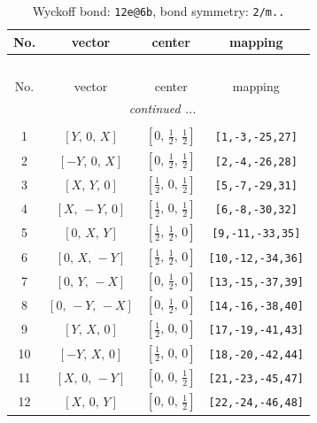 \documentclass[fleqn,8pt]{jsarticle}
\begin{document}
\renewcommand{\arraystretch}{1.2}
\begin{longtable}{cccc}
\caption{Wyckoff bond: {\tt 12e@6b}, bond symmetry: {\tt 2/m..}}
 \\
 \hline \hline
No. & vector & center & mapping \\ \hline \endfirsthead

\multicolumn{3}{l}{\tablename\ \thetable{}} \\
 \hline \hline
No. & vector & center & mapping \\ \hline \endhead

 \hline \hline
\multicolumn{3}{r}{\footnotesize\it continued ...} \\ \endfoot

 \hline \hline
\multicolumn{3}{r}{} \\ \endlastfoot

1 & $\left[ Y,\, 0,\, X \right]$ & $\left[ 0,\, \frac{1}{2},\, \frac{1}{2} \right]$ & {\tt [1,-3,-25,27]} \\ \hline
2 & $\left[ - Y,\, 0,\, X \right]$ & $\left[ 0,\, \frac{1}{2},\, \frac{1}{2} \right]$ & {\tt [2,-4,-26,28]} \\ \hline
3 & $\left[ X,\, Y,\, 0 \right]$ & $\left[ \frac{1}{2},\, 0,\, \frac{1}{2} \right]$ & {\tt [5,-7,-29,31]} \\ \hline
4 & $\left[ X,\, - Y,\, 0 \right]$ & $\left[ \frac{1}{2},\, 0,\, \frac{1}{2} \right]$ & {\tt [6,-8,-30,32]} \\ \hline
5 & $\left[ 0,\, X,\, Y \right]$ & $\left[ \frac{1}{2},\, \frac{1}{2},\, 0 \right]$ & {\tt [9,-11,-33,35]} \\ \hline
6 & $\left[ 0,\, X,\, - Y \right]$ & $\left[ \frac{1}{2},\, \frac{1}{2},\, 0 \right]$ & {\tt [10,-12,-34,36]} \\ \hline
7 & $\left[ 0,\, Y,\, - X \right]$ & $\left[ 0,\, \frac{1}{2},\, 0 \right]$ & {\tt [13,-15,-37,39]} \\ \hline
8 & $\left[ 0,\, - Y,\, - X \right]$ & $\left[ 0,\, \frac{1}{2},\, 0 \right]$ & {\tt [14,-16,-38,40]} \\ \hline
9 & $\left[ Y,\, X,\, 0 \right]$ & $\left[ \frac{1}{2},\, 0,\, 0 \right]$ & {\tt [17,-19,-41,43]} \\ \hline
10 & $\left[ - Y,\, X,\, 0 \right]$ & $\left[ \frac{1}{2},\, 0,\, 0 \right]$ & {\tt [18,-20,-42,44]} \\ \hline
11 & $\left[ X,\, 0,\, - Y \right]$ & $\left[ 0,\, 0,\, \frac{1}{2} \right]$ & {\tt [21,-23,-45,47]} \\ \hline
12 & $\left[ X,\, 0,\, Y \right]$ & $\left[ 0,\, 0,\, \frac{1}{2} \right]$ & {\tt [22,-24,-46,48]} \\
\end{longtable}
\end{document}
